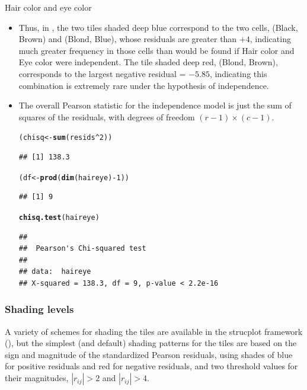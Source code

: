 \documentclass[11pt]{book}\usepackage[]{graphicx}\usepackage[]{color}
\makeatletter
\newcommand{\hlnum}[1]{\textcolor[rgb]{0.686,0.059,0.569}{#1}}%
\newcommand{\hlopt}[1]{\textcolor[rgb]{0,0,0}{#1}}%
\newcommand{\hlstd}[1]{\textcolor[rgb]{0.345,0.345,0.345}{#1}}%
\newcommand{\hlkwb}[1]{\textcolor[rgb]{0.69,0.353,0.396}{#1}}%
\newcommand{\hlkwd}[1]{\textcolor[rgb]{0.737,0.353,0.396}{\textbf{#1}}}%
\newenvironment{kframe}{%
 \def\at@end@of@kframe{}%
 \ifinner\ifhmode%
  \def\at@end@of@kframe{\end{minipage}}%
  \begin{minipage}{\columnwidth}%
 \fi\fi%
 \def\FrameCommand##1{\hskip\@totalleftmargin \hskip-\fboxsep
 \colorbox{shadecolor}{##1}\hskip-\fboxsep
     \hskip-\linewidth \hskip-\@totalleftmargin \hskip\columnwidth}%
 \MakeFramed {\advance\hsize-\width
   \@totalleftmargin\z@ \linewidth\hsize
   \@setminipage}}%
 {\par\unskip\endMakeFramed%
 \at@end@of@kframe}
\newenvironment{knitrout}{}{} %
\renewenvironment{knitrout}{\small\renewcommand{\baselinestretch}{.85}}{} %
\makeatother
\begin{document}
\begin{Example}[haireye2a]{Hair color and eye color}
\begin{itemize}
\item Thus, in , 
the two tiles shaded deep blue correspond to the two
cells, (Black, Brown) and (Blond, Blue), whose residuals are
greater than $+4$, indicating much greater frequency in those
cells than would be found if Hair color and Eye color were
independent.
The tile shaded deep red, (Blond, Brown),
corresponds to the largest negative residual = $-5.85$, indicating this combination
is extremely rare under the hypothesis of independence.
\item The overall Pearson \chisq{} statistic for the independence model
is just the
sum of squares of the residuals, with degrees of freedom $(r-1) \times (c-1)$.
\begin{knitrout}
\color{fgcolor}\begin{kframe}
\begin{alltt}
\hlstd{(chisq} \hlkwb{<-} \hlkwd{sum}\hlstd{(resids}\hlopt{^}\hlnum{2}\hlstd{))}
\end{alltt}
\begin{verbatim}
## [1] 138.3
\end{verbatim}
\begin{alltt}
\hlstd{(df} \hlkwb{<-} \hlkwd{prod}\hlstd{(}\hlkwd{dim}\hlstd{(haireye)}\hlopt{-}\hlnum{1}\hlstd{))}
\end{alltt}
\begin{verbatim}
## [1] 9
\end{verbatim}
\begin{alltt}
\hlkwd{chisq.test}\hlstd{(haireye)}
\end{alltt}
\begin{verbatim}
## 
## 	Pearson's Chi-squared test
## 
## data:  haireye
## X-squared = 138.3, df = 9, p-value < 2.2e-16
\end{verbatim}
\end{kframe}
\end{knitrout}

\end{itemize}
\end{Example}

\subsubsection{Shading levels}

A variety of schemes for shading the tiles are available in the
strucplot framework (),
but the simplest (and default) shading patterns for the tiles are based on 
the sign and magnitude of the 
standardized Pearson residuals, using shades of blue for positive residuals
and red for negative residuals, and two threshold values for their magnitudes,
$|r_{ij}| > 2$ and $|r_{ij}| > 4$.
\end{document}
